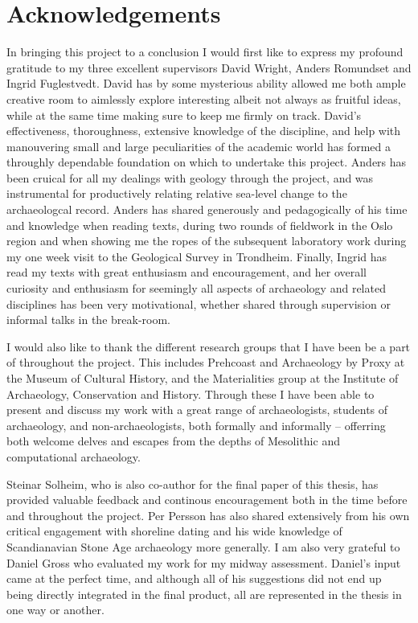 \pagestyle{plain}
\setcounter{page}{3}

\section*{Acknowledgements}
In bringing this project to a conclusion I would first like to express my profound gratitude to my three excellent supervisors David Wright, Anders Romundset and Ingrid Fuglestvedt. David has by some mysterious ability allowed me both ample creative room to aimlessly explore interesting albeit not always as fruitful ideas, while at the same time making sure to keep me firmly on track. David's effectiveness, thoroughness, extensive knowledge of the discipline, and help with manouvering small and large peculiarities of the academic world has formed a throughly dependable foundation on which to undertake this project. Anders has been cruical for all my dealings with geology through the project, and was instrumental for productively relating relative sea-level change to the archaeologcal record. Anders has shared generously and pedagogically of his time and knowledge when reading texts, during two rounds of fieldwork in the Oslo region and when showing me the ropes of the subsequent laboratory work during my one week visit to the Geological Survey in Trondheim. Finally, Ingrid has read my texts with great enthusiasm and encouragement, and her overall curiosity and enthusiasm for seemingly all aspects of archaeology and related disciplines has been very motivational, whether shared through supervision or informal talks in the break-room.  

I would also like to thank the different research groups that I have been be a part of throughout the project. This includes Prehcoast and Archaeology by Proxy at the Museum of Cultural History, and the Materialities group at the Institute of Archaeology, Conservation and History. Through these I have been able to present and discuss my work with a great range of archaeologists, students of archaeology, and non-archaeologists, both formally and informally -- offerring both welcome delves and escapes from the depths of Mesolithic and computational archaeology.

Steinar Solheim, who is also co-author for the final paper of this thesis, has provided valuable feedback and continous encouragement both in the time before and throughout the project. Per Persson has also shared extensively from his own critical engagement with shoreline dating and his wide knowledge of Scandianavian Stone Age archaeology more generally. I am also very grateful to Daniel Gross who evaluated my work for my midway assessment. Daniel's input came at the perfect time, and although all of his suggestions did not end up being directly integrated in the final product, all are represented in the thesis in one way or another.

